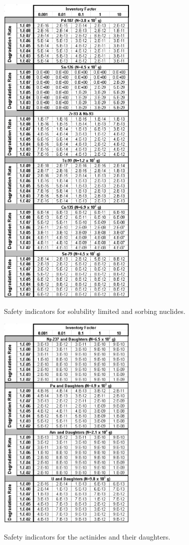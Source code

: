 \begin{table}[h!]
\centering
\includegraphics[width=0.5\textwidth]{./chapters/nuclide_sensitivity/clay/WFDegAndInv/IndicatorsSolLimSorbing.eps}
\caption{Safety indicators for solubility limited and sorbing nuclides.} 
\label{tab:WFDegIndicatorsPdSnZrNb}
\end{table}

\begin{table}[h!]
\centering
\includegraphics[width=0.5\textwidth]{./chapters/nuclide_sensitivity/clay/WFDegAndInv/IndicatorsActinides.eps}
\caption{Safety indicators for the actinides and their daughters.}
\label{tab:WFDegIndicatorsActinides}
\end{table}

\clearpage 
